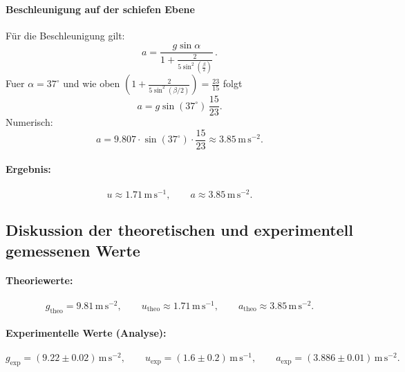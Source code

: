 \documentclass{article}
\begin{document}
\paragraph{Beschleunigung auf der schiefen Ebene}

Für die Beschleunigung gilt:
\begin{equation}
a
= \frac{g\sin\alpha}{1+\frac{2}{5\sin^{2}\!\left(\frac{\beta}{2}\right)}}\,.
\end{equation}
Fuer $\alpha=37^\circ$ und wie oben $\left(1+\frac{2}{5\sin^{2}(\beta/2)}\right)=\frac{23}{15}$ folgt
\begin{equation}
a
= g\sin(37^\circ)\,\frac{15}{23}.
\end{equation}
Numerisch:
\begin{equation}
a
= 9.807\cdot \sin(37^\circ)\cdot \frac{15}{23}
\approx 3.85\,\mathrm{m\,s^{-2}}.
\end{equation}

\paragraph{Ergebnis:}
\begin{equation}
{u \approx 1.71\,\mathrm{m\,s^{-1}},\qquad a \approx 3.85\,\mathrm{m\,s^{-2}}.}
\end{equation}

\subsection{Diskussion der theoretischen und experimentell gemessenen Werte}

\paragraph{Theoriewerte:}
\begin{equation}
g_\mathrm{theo}=9.81\,\mathrm{m\,s^{-2}},\qquad
u_\mathrm{theo}\approx 1.71\,\mathrm{m\,s^{-1}},\qquad
a_\mathrm{theo}\approx 3.85\,\mathrm{m\,s^{-2}}.
\end{equation}

\paragraph{Experimentelle Werte (Analyse):}
\begin{equation}
g_\mathrm{exp}=(9.22\pm 0.02)\,\mathrm{m\,s^{-2}},\qquad
u_\mathrm{exp}=(1.6\pm 0.2)\,\mathrm{m\,s^{-1}},\qquad
a_\mathrm{exp}=(3.886\pm 0.01)\,\mathrm{m\,s^{-2}}.
\end{equation}
\end{document}
